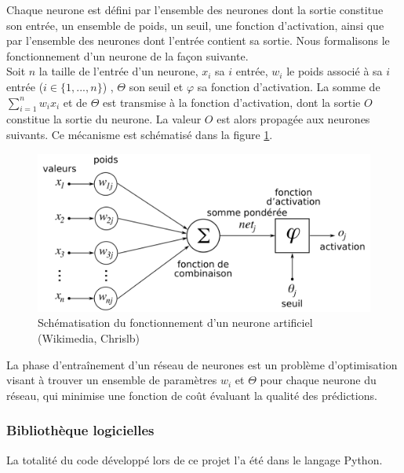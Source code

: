 \par Chaque neurone est défini par l'ensemble des neurones dont la sortie constitue son entrée, un ensemble de poids, un seuil, une fonction d'activation, ainsi que par l'ensemble des neurones dont l'entrée contient sa sortie. Nous formalisons le fonctionnement d'un neurone de la façon suivante.\\
Soit $n$ la taille de l'entrée d'un neurone, $x_i$ sa $i$ entrée, $w_i$ le poids associé à sa $i$ entrée ($i \in \{1, ..., n\}$) , $\Theta$ son seuil et $\varphi$ sa fonction d'activation. La somme de $\sum\limits_{i=1}^n w_ix_i$ et de $\Theta$ est transmise à la fonction d'activation, dont la sortie $O$ constitue la sortie du neurone. La valeur $O$ est alors propagée aux neurones suivants.
Ce mécanisme est schématisé dans la figure \ref{neurone}.\\

\begin{figure}
	\centering
	\includegraphics[scale=0.3]{images/neurone.png}
	\caption{Schématisation du fonctionnement d'un neurone artificiel (Wikimedia, Chrislb)}
	\label{neurone}
\end{figure}

\par La phase d'entraînement d'un réseau de neurones est un problème d'optimisation visant à trouver un ensemble de paramètres $w_i$ et $\Theta$ pour chaque neurone du réseau, qui minimise une fonction de coût évaluant la qualité des prédictions.

\subsubsection{Bibliothèque logicielles}

\label{apprentissage_automatique_bibli_log}

\par La totalité du code développé lors de ce projet l'a été dans le langage Python.\\


